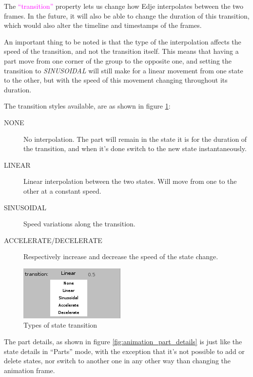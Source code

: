 \documentclass[a4paper]{profusion}
\newcommand{\GUILabel}[1]{\textcolor{magenta}{#1}}
\begin{document}
The \GUILabel{``transition''} property lets us change how Edje
interpolates between the two frames. In the future, it will also be
able to change the duration of this transition, which would also alter
the timeline and timestamps of the frames.

An important thing to be noted is that the type of the interpolation
affects the speed of the transition, and not the transition
itself. This means that having a part move from one corner of the
group to the opposite one, and setting the transition to
\emph{SINUSOIDAL} will still make for a linear movement from one state
to the other, but with the speed of this movement changing throughout
its duration.

The transition styles available, are as shown in figure
\ref{fig:animation_transitions}:
\begin{description}
\item[NONE] No interpolation. The part will remain in the state it is
  for the duration of the transition, and when it's done switch to the
  new state instantaneously.
\item[LINEAR] Linear interpolation between the two states. Will move
  from one to the other at a constant speed.
\item[SINUSOIDAL] Speed variations along the transition.
\item[ACCELERATE/DECELERATE] Respectively increase and decrease the
  speed of the state change.
\end{description}

\begin{figure}[h!]
  \centering
  \includegraphics{images/animation_transitions.png}
  \caption{Types of state transition}
  \label{fig:animation_transitions}
\end{figure}

  The part details, as shown in figure \ref{fig:animation_part_details} is
  just like the state details in ``Parts'' mode, with the exception that
  it's not possible to add or delete states, nor switch to another one in
  any other way than changing the animation frame.
\end{document}
